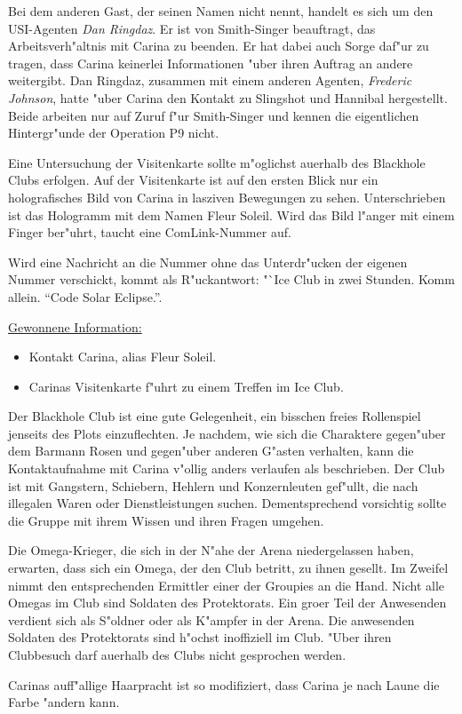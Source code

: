 Bei dem anderen Gast, der seinen Namen nicht nennt, handelt es sich um den USI-Agenten \emph{Dan Ringdaz}. Er ist von Smith-Singer beauftragt, das Arbeitsverh"altnis mit Carina zu beenden. Er hat dabei auch Sorge daf"ur zu tragen, dass Carina keinerlei Informationen "uber ihren Auftrag an andere weitergibt. Dan Ringdaz, zusammen mit einem anderen Agenten, \emph{Frederic Johnson}, hatte "uber Carina den Kontakt zu Slingshot und Hannibal hergestellt. Beide arbeiten nur auf Zuruf f"ur Smith-Singer und kennen die eigentlichen Hintergr"unde der Operation P9 nicht.


Eine Untersuchung der Visitenkarte sollte m"oglichst au\3erhalb des Blackhole Clubs erfolgen. Auf der Visitenkarte ist auf den ersten Blick nur ein holografisches Bild von Carina in lasziven Bewegungen zu sehen. Unterschrieben ist das Hologramm mit dem Namen Fleur Soleil. Wird das Bild l"anger mit einem Finger ber"uhrt, taucht eine ComLink-Nummer auf.

Wird eine Nachricht an die Nummer ohne das Unterdr"ucken der eigenen Nummer verschickt, kommt als R"uckantwort: "`Ice Club in zwei Stunden. Komm allein. "`Code Solar Eclipse."'.

\begin{remarks}
	\underline{Gewonnene Information:}
	
	\begin{itemize}
		\item Kontakt Carina, alias Fleur Soleil.
		\item Carinas Visitenkarte f"uhrt zu einem Treffen im Ice Club.
	\end{itemize}

	Der Blackhole Club ist eine gute Gelegenheit, ein bisschen freies Rollenspiel jenseits des Plots einzuflechten. Je nachdem, wie sich die Charaktere gegen"uber dem Barmann Rosen und gegen"uber anderen G"asten verhalten, kann die Kontaktaufnahme mit Carina v"ollig anders verlaufen als beschrieben. Der Club ist mit Gangstern, Schiebern, Hehlern und Konzernleuten gef"ullt, die nach illegalen Waren oder Dienstleistungen suchen. Dementsprechend vorsichtig sollte die Gruppe mit ihrem Wissen und ihren Fragen umgehen.

	Die Omega-Krieger, die sich in der N"ahe der Arena niedergelassen haben, erwarten, dass sich ein Omega, der den Club betritt, zu ihnen gesellt. Im Zweifel nimmt den entsprechenden Ermittler einer der Groupies an die Hand. Nicht alle Omegas im Club sind Soldaten des Protektorats. Ein gro\3er Teil der Anwesenden verdient sich als S"oldner oder als K"ampfer in der Arena. Die anwesenden Soldaten des Protektorats sind h"ochst inoffiziell im Club. "Uber ihren Clubbesuch darf au\3erhalb des Clubs nicht gesprochen werden.
	
	Carinas auff"allige Haarpracht ist so modifiziert, dass Carina je nach Laune die Farbe "andern kann.
\end{remarks}


